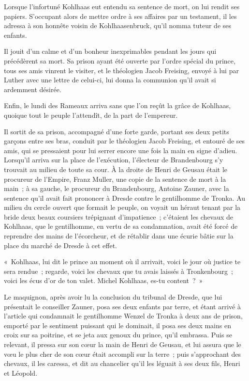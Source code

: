 \documentclass[french,twoside]{book} %
\newcommand\chaptercont{} %
\begin{document}
\chaptercont
\noindent Lorsque l’infortuné Kohlhaas eut entendu sa sentence de mort, on lui rendit ses papiers. S’occupant alors de mettre ordre à ses affaires par un testament, il les adressa à son honnête voisin de Kohlhaasenbruck, qu’il nomma tuteur de ses enfants.\par
Il jouit d’un calme et d’un bonheur inexprimables pendant les jours qui précédèrent sa mort. Sa prison ayant été ouverte par l’ordre spécial du prince, tous ses amis vinrent le visiter, et le théologien Jacob Freising, envoyé à lui par Luther avec une lettre de celui-ci, lui donna la communion qu’il avait si ardemment désirée.\par
Enfin, le lundi des Rameaux arriva sans que l’on reçût la grâce de Kohlhaas, quoique tout le peuple l’attendît, de la part de l’empereur.\par
Il sortit de sa prison, accompagné d’une forte garde, portant ses deux petits garçons entre ses bras, conduit par le théologien Jacob Freising, et entouré de ses amis, qui se pressaient pour lui serrer encore une fois la main en signe d’adieu. Lorsqu’il arriva sur la place de l’exécution, l’électeur de Brandenbourg s’y trouvait au milieu de toute sa cour. À la droite de Henri de Geusau était le procureur de l’Empire, Franz Muller, une copie de la sentence de mort à la main ; à sa gauche, le procureur du Brandenbourg, Antoine Zauner, avec la sentence qu’il avait fait prononcer à Dresde contre le gentilhomme de Tronka. Au milieu du cercle ouvert que formait le peuple, on voyait un héraut tenant par la bride deux beaux coursiers trépignant d’impatience ; c’étaient les chevaux de Kohlhaas, que le gentilhomme, en vertu de sa condamnation, avait été forcé de reprendre des mains de l’écorcheur, et de rétablir dans une écurie bâtie sur la place du marché de Dresde à cet effet.\par
« Kohlhaas, lui dit le prince au moment où il arrivait, voici le jour où justice te sera rendue ; regarde, voici les chevaux que tu avais laissés à Tronkenbourg ; voici les écus d’or de ton valet. Michel Kohlhaas, es-tu content ? »\par
Le maquignon, après avoir lu la conclusion du tribunal de Dresde, que lui présentait le conseiller Zauner, posa ses deux enfants par terre, et étant arrivé à l’article qui condamnait le gentilhomme Wenzel de Tronka à deux ans de prison, emporté par le sentiment puissant qui le dominait, il posa ses deux mains en croix sur sa poitrine, et se jeta aux genoux du prince, qu’il embrassa. Puis se relevant, il pressa sur son cœur la main de Henri de Geusau, et lui assura que le vœu le plus cher de son cœur était accompli sur la terre ; puis s’approchant des chevaux, il les caressa, et dit au chancelier qu’il les léguait à ses deux fils, Henri et Léopold.\par
\end{document}

